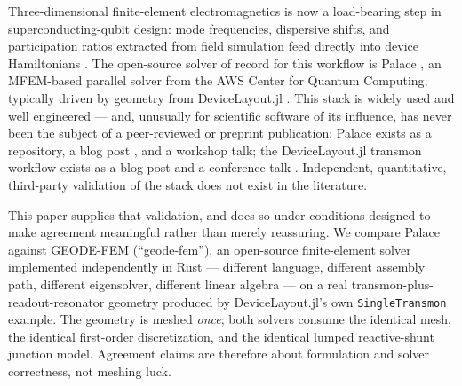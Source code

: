 \documentclass{anvil-paper}
\begin{document}
Three-dimensional finite-element electromagnetics is now a load-bearing step
in superconducting-qubit design: mode frequencies, dispersive shifts, and
participation ratios extracted from field simulation feed directly into
device Hamiltonians \citep{koch2007,nigg2012,minev2021}. The open-source
solver of record for this workflow is Palace \citep{palace}, an MFEM-based
\citep{mfem,andrej2024high} parallel solver from the AWS Center for Quantum
Computing, typically driven by geometry from DeviceLayout.jl
\citep{devicelayout,devicelayout-blog}. This stack is widely used and
well engineered --- and, unusually for scientific software of its
influence, has never been the subject of a peer-reviewed or preprint
publication: Palace exists as a repository, a blog post
\citep{palace-blog}, and a workshop talk; the DeviceLayout.jl transmon
workflow exists as a blog post and a conference talk
\citep{devicelayout-blog,devicelayout-juliacon}. Independent, quantitative,
third-party validation of the stack does not exist in the literature.

This paper supplies that validation, and does so under conditions designed
to make agreement meaningful rather than merely reassuring. We compare
Palace against GEODE-FEM (``geode-fem''), an open-source finite-element
solver implemented independently in Rust --- different language, different
assembly path, different eigensolver, different linear algebra --- on a real
transmon-plus-readout-resonator geometry produced by DeviceLayout.jl's own
\texttt{SingleTransmon} example. The geometry is meshed \emph{once}; both
solvers consume the identical mesh, the identical first-order discretization,
and the identical lumped reactive-shunt junction model. Agreement claims are
therefore about formulation and solver correctness, not meshing luck.
\end{document}
